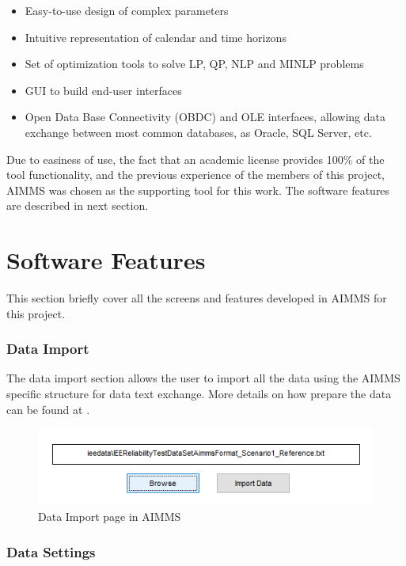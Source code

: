 \documentclass[12pt,LUDisStyle,twosided]{book}
\begin{document}
\begin{itemize}
\item Easy-to-use design of complex parameters
\item Intuitive representation of calendar and time horizons
\item Set of optimization tools to solve LP, QP, NLP and MINLP problems
\item GUI to build end-user interfaces
\item Open Data Base Connectivity (OBDC) and OLE interfaces, allowing data exchange between most common databases, as Oracle, SQL Server, etc.
\end{itemize}

Due to easiness of use, the fact that an academic license provides 100\% of the tool functionality, and the previous experience of the members of this project, AIMMS was chosen as the supporting tool for this work. The software features are described in next section.

\section{Software Features}

This section briefly cover all the screens and features developed in AIMMS for this project.

\subsubsection{Data Import}

The data import section allows the user to import all the data using the AIMMS specific structure for data text exchange. More details on how prepare the data can be found at \cite{bisschop}.

\begin{figure}[h] 
	\begin{center}
		\includegraphics[keepaspectratio]{aimmsScreenImportPage.png}
	  	\caption{Data Import page in AIMMS}
     	\label{fig:aimmsScreenImportPage}
	\end{center}
\end{figure}

\subsubsection{Data Settings}
\end{document}
